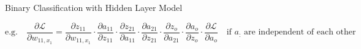 \documentclass[mathserif, aspectratio=1610]{intbeamer}
\begin{document}
\begin{frame}{Binary Classification with Hidden Layer Model}
\begin{center}
\end{center}
$$
\text{e.g.}\quad
\frac{\partial \mathcal{L}}{\partial w_{11,x_1}}
=
\frac{\partial z_{11}}{\partial w_{11,x_1}}\cdot
\frac{\partial a_{11}}{\partial z_{11}}\cdot
\frac{\partial z_{21}}{\partial a_{11}}\cdot
\frac{\partial a_{21}}{\partial z_{21}}\cdot
\frac{\partial z_o}{\partial a_{21}}\cdot
\frac{\partial a_o}{\partial z_o}\cdot
\frac{\partial \mathcal{L}}{\partial a_o}
\quad\text{if $a_:$ are independent of each other}
$$
\end{frame}
\end{document}

